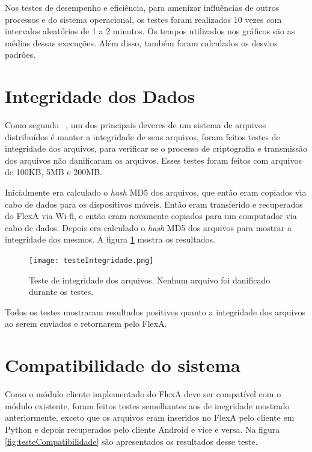      Nos testes de desempenho e eficiência, para amenizar influências de outros processos e do sistema operacional, os testes foram realizados 10 vezes com intervalos aleatórios de 1 a 2 minutos. Os tempos utilizados nos gráficos são as médias dessas execuções. Além disso, também foram calculados os desvios padrões.

\section{Integridade dos Dados}

Como segundo ~\cite{coulouris}, um dos principais deveres de um sistema de arquivos distribuídos é manter a integridade de seus arquivos, foram feitos testes de integridade dos arquivos, para verificar se o processo de criptografia e transmissão dos arquivos não danificaram os arquivos. Esses testes foram feitos com arquivos de 100KB, 5MB e 200MB.
    
    Inicialmente era calculado o \textit{hash} MD5 dos arquivos, que então eram copiados via cabo de dados para os dispositivos móveis. Então eram transferido e recuperados do FlexA via Wi-fi, e então eram novamente copiados para um computador via cabo de dados. Depois era calculado o \textit{hash} MD5 dos arquivos para mostrar a integridade dos mesmos. A figura \ref{fig:testesIntegridade} mostra os resultados.

    \begin{figure}[!ht]
    \centering
    \texttt{[image: testeIntegridade.png]}
    \caption{Teste de integridade dos arquivos. Nenhum arquivo foi danificado durante os testes.}
    \label{fig:testesIntegridade}
    \end{figure}

    Todos os testes mostraram resultados positivos quanto a integridade dos arquivos ao serem enviados e retornarem pelo FlexA.
    
\section{Compatibilidade do sistema}

    Como o módulo cliente implementado do FlexA deve ser compatível com o módulo existente, foram feitos testes semelhantes aos de inegridade mostrado anteriormente, exceto que os arquivos eram inseridos no FlexA pelo cliente em Python e depois recuperados pelo cliente Android e vice e versa. Na figura \ref{fig:testeCompatibilidade} são apresentados os resultados desse teste.
    
